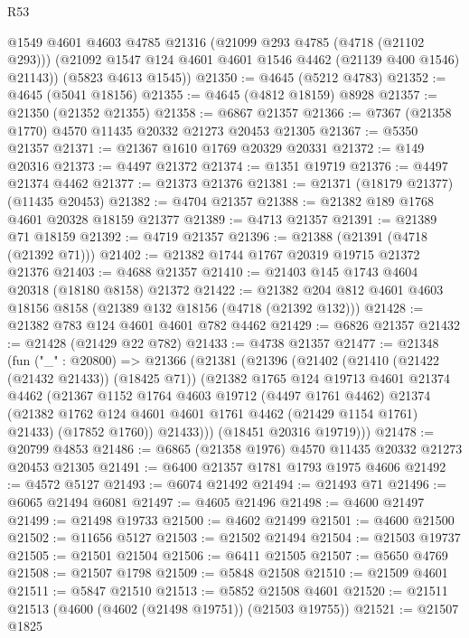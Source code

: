 \begin{lexlean}{R53}
\begin{coremodule}
        @1549
        @4601
        @4603
        @4785
        @21316
        (@21099 @293 @4785 (@4718 (@21102 @293)))
        (@21092 @1547 @124 @4601 @4601 @1546 @4462 (@21139 @400 @1546) @21143))
      (@5823 @4613 @1545))
@21350 := @4645 (@5212 @4783)
@21352 := @4645 (@5041 @18156)
@21355 := @4645 (@4812 @18159) @8928
@21357 := @21350 (@21352 @21355)
@21358 := @6867 @21357
@21366 := @7367 (@21358 @1770) @4570 @11435 @20332 @21273 @20453 @21305
@21367 := @5350 @21357
@21371 := @21367 @1610 @1769 @20329 @20331
@21372 := @149 @20316
@21373 := @4497 @21372
@21374 := @1351 @19719
@21376 := @4497 @21374 @4462
@21377 := @21373 @21376
@21381 := @21371 (@18179 @21377) (@11435 @20453)
@21382 := @4704 @21357
@21388 := @21382 @189 @1768 @4601 @20328 @18159 @21377
@21389 := @4713 @21357
@21391 := @21389 @71 @18159
@21392 := @4719 @21357
@21396 := @21388 (@21391 (@4718 (@21392 @71)))
@21402 := @21382 @1744 @1767 @20319 @19715 @21372 @21376
@21403 := @4688 @21357
@21410 := @21403 @145 @1743 @4604 @20318 (@18180 @8158) @21372
@21422 := @21382 @204 @812 @4601 @4603 @18156 @8158 (@21389 @132 @18156 (@4718 (@21392 @132)))
@21428 := @21382 @783 @124 @4601 @4601 @782 @4462
@21429 := @6826 @21357
@21432 := @21428 (@21429 @22 @782)
@21433 := @4738 @21357
@21477 := @21348
    (fun ("_" : @20800) =>
    @21366
      (@21381
        (@21396
          (@21402
            (@21410 (@21422 (@21432 @21433)) (@18425 @71))
            (@21382
              @1765
              @124
              @19713
              @4601
              @21374
              @4462
              (@21367
                @1152
                @1764
                @4603
                @19712
                (@4497 @1761 @4462)
                @21374
                (@21382 @1762 @124 @4601 @4601 @1761 @4462 (@21429 @1154 @1761) @21433)
                (@17852 @1760))
              @21433)))
        (@18451 @20316 @19719)))
@21478 := @20799 @4853
@21486 := @6865 (@21358 @1976) @4570 @11435 @20332 @21273 @20453 @21305
@21491 := @6400 @21357 @1781 @1793 @1975 @4606
@21492 := @4572 @5127
@21493 := @6074 @21492
@21494 := @21493 @71
@21496 := @6065 @21494 @6081
@21497 := @4605 @21496
@21498 := @4600 @21497
@21499 := @21498 @19733
@21500 := @4602 @21499
@21501 := @4600 @21500
@21502 := @11656 @5127
@21503 := @21502 @21494
@21504 := @21503 @19737
@21505 := @21501 @21504
@21506 := @6411 @21505
@21507 := @5650 @4769
@21508 := @21507 @1798
@21509 := @5848 @21508
@21510 := @21509 @4601
@21511 := @5847 @21510
@21513 := @5852 @21508 @4601
@21520 := @21511 @21513 (@4600 (@4602 (@21498 @19751)) (@21503 @19755))
@21521 := @21507 @1825

\end{coremodule}
\end{lexlean}
